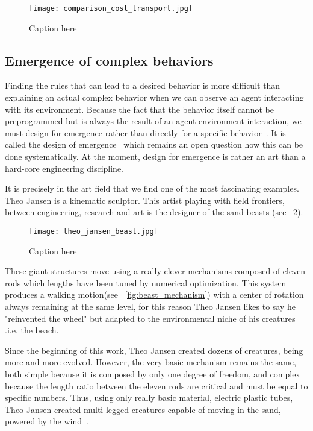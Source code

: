 \begin{figure}[]
    \begin{center}
        \texttt{[image: comparison\_cost\_transport.jpg]}
    \end{center}
    \caption{Caption here}
    \label{fig:figure1}
\end{figure}


\subsection{Emergence of complex behaviors} %

Finding the rules that can lead to a desired behavior is more difficult than explaining an actual complex behavior when we can observe an agent interacting with its environment. Because the fact that the behavior itself cannot be preprogrammed but is always the result of an agent-environment interaction, we must design for emergence rather than directly for a specific behavior~\cite{Pfeifer06}. It is called the design of emergence~\cite{Steels1991emergence} which remains an open question how this can be done systematically. At the moment, design for emergence is rather an art than a hard-core engineering discipline.

It is precisely in the art field that we find one of the most fascinating examples. Theo Jansen is a kinematic sculptor. This artist playing with field frontiers, between engineering, research and art is the designer of the sand beasts (see \figurename~\ref{fig:theo_jansen_beast}).

\begin{figure}[]
    \begin{center}
        \texttt{[image: theo\_jansen\_beast.jpg]}
    \end{center}
    \caption{Caption here}
    \label{fig:theo_jansen_beast}
\end{figure}

These giant structures move using a really clever mechanisms composed of eleven rods which lengths have been tuned by numerical optimization. This system produces a walking motion(see \figurename~\ref{fig:beast_mechanism}) with a center of rotation always remaining at the same level, for this reason Theo Jansen likes to say he "reinvented the wheel" but adapted to the environmental niche of his creatures .i.e. the beach.

Since the beginning of this work, Theo Jansen created dozens of creatures, being more and more evolved. However, the very basic mechanism remains the same, both simple because it is composed by only one degree of freedom, and complex because the length ratio between the eleven rods are critical and must be equal to specific numbers. Thus, using only really basic material, electric plastic tubes, Theo Jansen created multi-legged creatures capable of moving in the sand, powered by the wind~\cite{jansen2007theo}.


